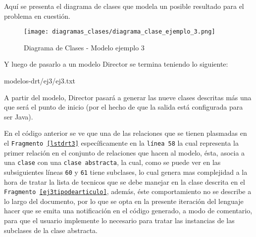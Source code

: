 Aquí se presenta el diagrama de clases que modela un posible resultado para el
problema en cuestión.

\begin{figure}[H]
	\centering
	\texttt{[image: diagramas\_clases/diagrama\_clase\_ejemplo\_3.png]}
	\caption{Diagrama de Clases - Modelo ejemplo 3}
	\label{fig:dc_mod_ej_3}
\end{figure}

Y luego de pasarlo a un modelo Director se termina teniendo lo siguiente:


{modelos-drt/ej3/ej3.txt}

A partir del modelo, Director pasará a generar las nueve clases descritas más
una que será el punto de inicio (por el hecho de que la salida está configurada
para ser Java).











En el código anterior se ve que una de las relaciones que se tienen plasmadas
en el \texttt{Fragmento \ref{lstdrt3}} específicamente en la \texttt{línea 58}
la cual representa la primer relación en el conjunto de relaciones que hacen al
modelo, ésta, asocia a una \texttt{clase} con una \texttt{clase abstracta}, la
cual, como se puede ver en las subsiguientes líneas \texttt{60} y \texttt{61}
tiene subclases, lo cual genera mas complejidad a la hora de tratar la lista de
tecnicos que se debe manejar en la clase descrita en el \texttt{Fragmento
\ref{ej3tipodearticulo}}, además, éste comportamiento no se describe a lo
largo del documento, por lo que se opta en la presente iteración del lenguaje
hacer que se emita una notificación en el código generado, a modo de comentario, para
que el usuario implemente lo necesario para tratar las instancias de las
subclases de la clase abstracta.

